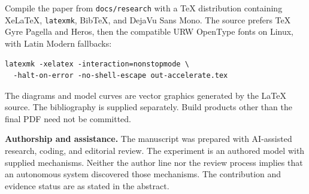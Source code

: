 \documentclass[11pt,letterpaper]{article}
\theoremstyle{remark}\newtheorem{remark}{Remark}[section]
\begin{document}
Compile the paper from \texttt{docs/research} with a TeX distribution containing XeLaTeX, \texttt{latexmk}, BibTeX, and DejaVu Sans Mono.
The source prefers TeX Gyre Pagella and Heros, then the compatible URW OpenType fonts on Linux, with Latin Modern fallbacks:
\begin{lstlisting}
latexmk -xelatex -interaction=nonstopmode \
  -halt-on-error -no-shell-escape out-accelerate.tex
\end{lstlisting}
The diagrams and model curves are vector graphics generated by the LaTeX source.
The bibliography is supplied separately.
Build products other than the final PDF need not be committed.

\textbf{Authorship and assistance.}
The manuscript was prepared with AI-assisted research, coding, and editorial review.
The experiment is an authored model with supplied mechanisms.
Neither the author line nor the review process implies that an autonomous system discovered those mechanisms.
The contribution and evidence status are as stated in the abstract.
\end{document}
